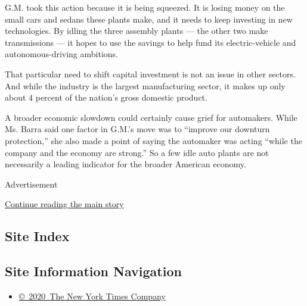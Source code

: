 G.M. took this action because it is being squeezed. It is losing money
on the small cars and sedans these plants make, and it needs to keep
investing in new technologies. By idling the three assembly plants ---
the other two make transmissions --- it hopes to use the savings to help
fund its electric-vehicle and autonomous-driving ambitions.

That particular need to shift capital investment is not an issue in
other sectors. And while the industry is the largest manufacturing
sector, it makes up only about 4 percent of the nation's gross domestic
product.

A broader economic slowdown could certainly cause grief for automakers.
While Ms. Barra said one factor in G.M.'s move was to ``improve our
downturn protection,'' she also made a point of saying the automaker was
acting ``while the company and the economy are strong.'' So a few idle
auto plants are not necessarily a leading indicator for the broader
American economy.

Advertisement

\protect\hyperlink{after-bottom}{Continue reading the main story}

\hypertarget{site-index}{%
\subsection{Site Index}\label{site-index}}

\hypertarget{site-information-navigation}{%
\subsection{Site Information
Navigation}\label{site-information-navigation}}

\begin{itemize}
\tightlist
\item
  \href{https://help.nytimes.com/hc/en-us/articles/115014792127-Copyright-notice}{©~2020~The
  New York Times Company}
\end{itemize}

